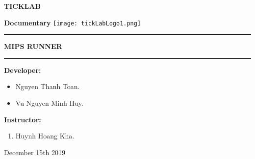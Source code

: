 \documentclass[10pt]{article}
\begin{document}
\begin{titlepage}
\begin{Large}
\begin{center}\textbf{TICKLAB}\end{center}
\begin{center}
\textbf{Documentary}
\texttt{[image: tickLabLogo1.png]}
\end{center}
\end{Large}

\begin{flushleft}
\begin{itemize}
\begin{Large}
\rule[10pt]{\textwidth}{1pt}
\begin{Huge}
\textbf{MIPS RUNNER}
\end{Huge}
\rule{\textwidth}{1pt}

\vspace{1cm}
\item[] \textbf{Developer: }
	\begin{itemize}
	\item[] Nguyen Thanh Toan.
	\item[] Vu Nguyen Minh Huy. 
	\end{itemize}
\item[]\textbf{Instructor:}
\begin{enumerate}
\item[]	Huynh Hoang Kha.
\end{enumerate}

\end{Large}
\end{itemize}
\end{flushleft}

\begin{center}
\begin{Large}December 15th 2019 \end{Large}
\end{center}
\end{titlepage}
\newpage

\begin{Large}
\tableofcontents
\end{Large}
\newpage

\end{document}
